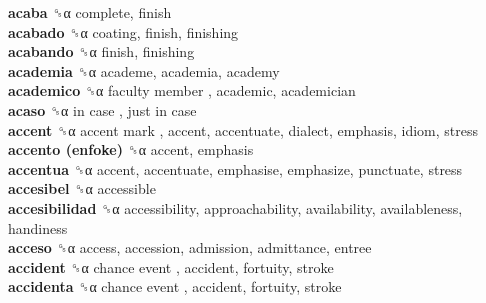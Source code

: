\textbf{acaba} ␝α  complete, finish  \\
\textbf{acabado} ␝α  coating, finish, finishing  \\
\textbf{acabando} ␝α  finish, finishing  \\
\textbf{academia} ␝α  academe, academia, academy  \\
\textbf{academico} ␝α   faculty member , academic, academician  \\
\textbf{acaso} ␝α   in case ,  just in case   \\
\textbf{accent} ␝α   accent mark , accent, accentuate, dialect, emphasis, idiom, stress  \\
\textbf{accento (enfoke)} ␝α  accent, emphasis  \\
\textbf{accentua} ␝α  accent, accentuate, emphasise, emphasize, punctuate, stress  \\
\textbf{accesibel} ␝α  accessible  \\
\textbf{accesibilidad} ␝α  accessibility, approachability, availability, availableness, handiness  \\
\textbf{acceso} ␝α  access, accession, admission, admittance, entree  \\
\textbf{accident} ␝α   chance event , accident, fortuity, stroke  \\
\textbf{accidenta} ␝α   chance event , accident, fortuity, stroke  \\
